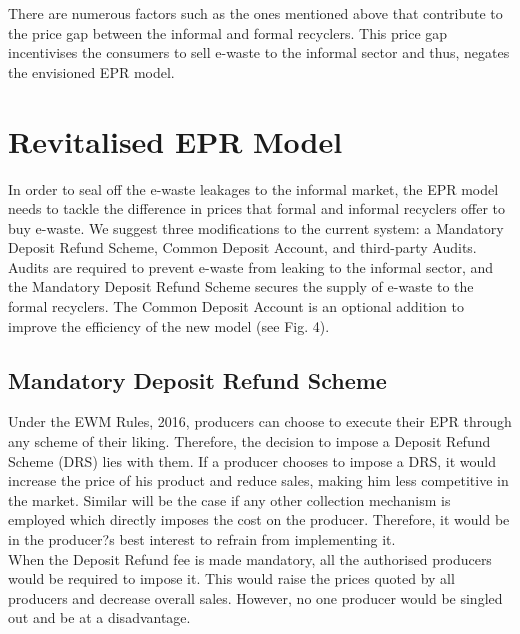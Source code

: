\documentclass[a4paper, 12pt]{article}
\begin{document}
                    There are numerous factors such as the ones mentioned above that contribute to the price gap between the informal and formal recyclers. This price gap incentivises the consumers to sell e-waste to the informal sector and thus, negates the envisioned EPR model. \\
                    
                    
                    \section{Revitalised EPR Model}
                    
                    In order to seal off the e-waste leakages to the informal market, the EPR model needs to tackle the difference in prices that formal and informal recyclers offer to buy e-waste. We suggest three modifications to the current system: a Mandatory Deposit Refund Scheme, Common Deposit Account, and third-party Audits. Audits are required to prevent e-waste from leaking to the informal sector, and the Mandatory Deposit Refund Scheme secures the supply of e-waste to the formal recyclers. The Common Deposit Account is an optional addition to improve the efficiency of the new model (see Fig. 4). \\
                    
                    \subsection{Mandatory Deposit Refund Scheme}
                    
                    Under the EWM Rules, 2016, producers can choose to execute their EPR through any scheme of their liking. Therefore, the decision to impose a Deposit Refund Scheme (DRS) lies with them. If a producer chooses to impose a DRS, it would increase the price of his product and reduce sales, making him less competitive in the market. Similar will be the case if any other collection mechanism is employed which directly imposes the cost on the producer. Therefore, it would be in the producer?s best interest to refrain from implementing it.\\
                    
                    When the Deposit Refund fee is made mandatory, all the authorised producers would be required to impose it. This would raise the prices quoted by all producers and decrease overall sales. However, no one producer would be singled out and be at a disadvantage.\\
                      
\end{document}
